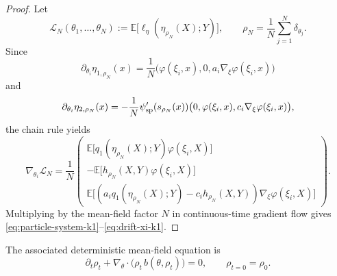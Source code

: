 \documentclass[11pt]{article}
\theoremstyle{definition}
\newcommand{\E}{\mathbb{E}}
\newcommand{\mc}[1]{\mathcal{#1}}
\begin{document}
\begin{proof}
Let
\[
  \mc{L}_N(\theta_1,\dots,\theta_N)
  :=
  \E\big[\ell_\eta(\eta_{\rho_N}(X);Y)\big],
  \qquad
  \rho_N=\frac1N\sum_{j=1}^N \delta_{\theta_j}.
\]
Since
\[
  \partial_{\theta_i}\eta_{1,\rho_N}(x)
  =
  \frac1N\bigl(\varphi(\xi_i,x),0,a_i\nabla_\xi\varphi(\xi_i,x)\bigr)
\]
and
\[
  \partial_{\theta_i}\eta_{2,\rho_N}(x)
  =
  -\frac1N\psi_{\rm sp}'(s_{\rho_N}(x))
  \bigl(0,\varphi(\xi_i,x),c_i\nabla_\xi\varphi(\xi_i,x)\bigr),
\]
the chain rule yields
\[
  \nabla_{\theta_i}\mc{L}_N
  =
  \frac1N
  \begin{pmatrix}
    \E\big[q_1(\eta_{\rho_N}(X);Y)\varphi(\xi_i,X)\big]
    \\
    -\E\big[h_{\rho_N}(X,Y)\varphi(\xi_i,X)\big]
    \\
    \E\big[(a_iq_1(\eta_{\rho_N}(X);Y)-c_i h_{\rho_N}(X,Y))
    \nabla_\xi\varphi(\xi_i,X)\big]
  \end{pmatrix}.
\]
Multiplying by the mean-field factor $N$ in continuous-time gradient flow gives
\eqref{eq:particle-system-k1}--\eqref{eq:drift-xi-k1}.
\end{proof}

The associated deterministic mean-field equation is
\begin{equation}
  \partial_t \rho_t
  +
  \nabla_\theta\cdot\bigl(\rho_t\,b(\theta,\rho_t)\bigr)
  =
  0,
  \qquad
  \rho_{t=0}=\rho_0.
  \label{eq:mf-pde-k1}
\end{equation}
\end{document}

